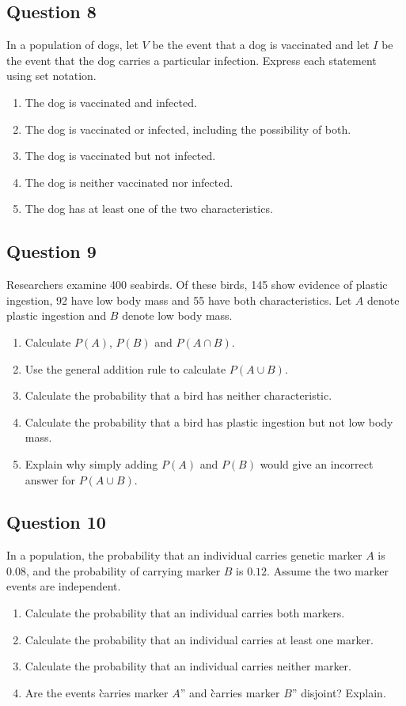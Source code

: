\documentclass[10pt,letterpaper]{article}
\newcommand{\questionheading}[1]{%
  \subsection*{Question #1}
}
\begin{document}
\newpage

\questionheading{8}
In a population of dogs, let $V$ be the event that a dog is vaccinated and let $I$ be the event that the dog carries a particular infection. Express each statement using set notation.
\begin{enumerate}
	\item The dog is vaccinated and infected.
	 \item The dog is vaccinated or infected, including the possibility of both.
	\item The dog is vaccinated but not infected.
	\item The dog is neither vaccinated nor infected.
	\item The dog has at least one of the two characteristics.
\end{enumerate}

\questionheading{9}
Researchers examine 400 seabirds. Of these birds, 145 show evidence of plastic ingestion, 92 have low body mass and 55 have both characteristics. Let $A$ denote plastic ingestion and $B$ denote low body mass.
\begin{enumerate}
	\item Calculate $P(A)$, $P(B)$ and $P(A\cap B)$.
	\item Use the general addition rule to calculate $P(A\cup B)$.
	\item Calculate the probability that a bird has neither characteristic.
	\item Calculate the probability that a bird has plastic ingestion but not low body mass.
	 \item Explain why simply adding $P(A)$ and $P(B)$ would give an incorrect answer for $P(A\cup B)$.
\end{enumerate}

\questionheading{10}
In a population, the probability that an individual carries genetic marker $A$ is $0.08$, and the probability of carrying marker $B$ is $0.12$. Assume the two marker events are independent.
\begin{enumerate}
	\item Calculate the probability that an individual carries both markers.
	\item Calculate the probability that an individual carries at least one marker.
	\item Calculate the probability that an individual carries neither marker.
	\item Are the events \`\`carries marker $A$'' and \`\`carries marker $B$'' disjoint? Explain.
\end{enumerate}
\end{document}
